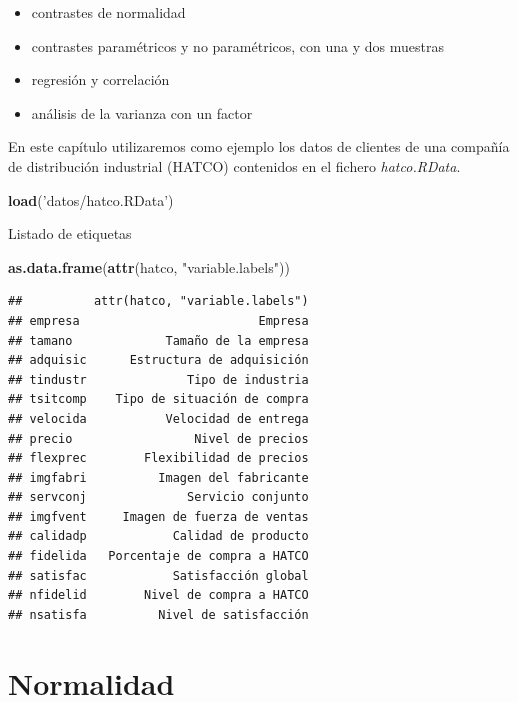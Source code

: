 \documentclass[]{book}
\newenvironment{Shaded}{\begin{snugshade}}{\end{snugshade}}
\newcommand{\KeywordTok}[1]{\textcolor[rgb]{0.13,0.29,0.53}{\textbf{#1}}}
\newcommand{\NormalTok}[1]{#1}
\newcommand{\StringTok}[1]{\textcolor[rgb]{0.31,0.60,0.02}{#1}}
\providecommand{\tightlist}{%
  \setlength{\itemsep}{0pt}\setlength{\parskip}{0pt}}
\begin{document}
\begin{itemize}
\tightlist
\item
  contrastes de normalidad
\item
  contrastes paramétricos y no paramétricos, con una y dos muestras
\item
  regresión y correlación
\item
  análisis de la varianza con un factor
\end{itemize}

En este capítulo utilizaremos como ejemplo los datos de clientes de una compañía de distribución industrial (HATCO)
contenidos en el fichero \emph{hatco.RData}.

\begin{Shaded}
\begin{Highlighting}[]
\KeywordTok{load}\NormalTok{(}\StringTok{'datos/hatco.RData'}\NormalTok{)}
\end{Highlighting}
\end{Shaded}

Listado de etiquetas

\begin{Shaded}
\begin{Highlighting}[]
\KeywordTok{as.data.frame}\NormalTok{(}\KeywordTok{attr}\NormalTok{(hatco, }\StringTok{"variable.labels"}\NormalTok{))}
\end{Highlighting}
\end{Shaded}

\begin{verbatim}
##          attr(hatco, "variable.labels")
## empresa                         Empresa
## tamano             Tamaño de la empresa
## adquisic      Estructura de adquisición
## tindustr              Tipo de industria
## tsitcomp    Tipo de situación de compra
## velocida           Velocidad de entrega
## precio                 Nivel de precios
## flexprec        Flexibilidad de precios
## imgfabri          Imagen del fabricante
## servconj              Servicio conjunto
## imgfvent     Imagen de fuerza de ventas
## calidadp            Calidad de producto
## fidelida   Porcentaje de compra a HATCO
## satisfac            Satisfacción global
## nfidelid        Nivel de compra a HATCO
## nsatisfa          Nivel de satisfacción
\end{verbatim}

\hypertarget{normalidad}{%
\section{Normalidad}\label{normalidad}}
\end{document}
